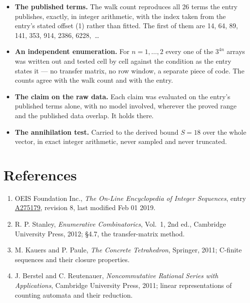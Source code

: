 \documentclass[11pt]{article}
\theoremstyle{definition}
\begin{document}
\begin{itemize}

\item {\bfseries The published terms.} The walk count reproduces all 26 terms the entry publishes, exactly, in integer arithmetic, with the index taken from the entry's stated offset (1) rather than fitted. The first of them are 14, 64, 89, 141, 353, 914, 2386, 6228,~\dots

\item {\bfseries An independent enumeration.} For $n = 1,\dots,2$ every one of the $3^{4n}$ arrays was written out and tested cell by cell against the condition as the entry states it --- no transfer matrix, no row window, a separate piece of code. The counts agree with the walk count and with the entry.

\item {\bfseries The claim on the raw data.} Each claim was evaluated on the entry's published terms alone, with no model involved, wherever the proved range and the published data overlap. It holds there.

\item {\bfseries The annihilation test.} Carried to the derived bound $S = 18$ over the whole vector, in exact integer arithmetic, never sampled and never truncated.

\end{itemize}

\section{References}

\begin{enumerate}

\item OEIS Foundation Inc., \emph{The On-Line Encyclopedia of Integer Sequences}, entry \href{https://oeis.org/A275179}{A275179}, revision 8, last modified Feb 01 2019.

\item R. P. Stanley, \emph{Enumerative Combinatorics}, Vol.~1, 2nd ed., Cambridge University Press, 2012; \S4.7, the transfer-matrix method.

\item M. Kauers and P. Paule, \emph{The Concrete Tetrahedron}, Springer, 2011; C-finite sequences and their closure properties.

\item J. Berstel and C. Reutenauer, \emph{Noncommutative Rational Series with Applications}, Cambridge University Press, 2011; linear representations of counting automata and their reduction.

\end{enumerate}
\end{document}
